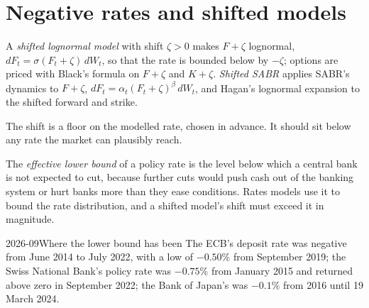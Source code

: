 \label{lst:rc:sabr-in-rates-and-the-volatility-cube:hagan}

\section{Negative rates and shifted models}

\begin{definition}\label{def:rc:sabr-in-rates-and-the-volatility-cube:shifted}
A \emph{shifted lognormal model} with shift
$\zeta>0$ makes $F+\zeta$ lognormal, $dF_t=\sigma(F_t+\zeta)\,dW_t$, so that the
rate is bounded below by $-\zeta$; options are priced with Black's formula on
$F+\zeta$ and $K+\zeta$. \emph{Shifted SABR} applies SABR's
dynamics to $F+\zeta$, $dF_t=\alpha_t(F_t+\zeta)^\beta\,dW_t$, and Hagan's lognormal
expansion to the shifted forward and strike.
\end{definition}

The shift is a floor on the modelled rate, chosen in advance. It should sit
below any rate the market can plausibly reach.

\begin{definition}\label{def:rc:sabr-in-rates-and-the-volatility-cube:elb}
The \emph{effective lower bound} of a policy rate is
the level below which a central bank is not expected to cut, because further
cuts would push cash out of the banking system or hurt banks more than they
ease conditions. Rates models use it to bound the rate distribution, and a
shifted model's shift must exceed it in magnitude.
\end{definition}

\begin{dated}{2026-09}{Where the lower bound has been}\label{dat:rc:sabr-in-rates-and-the-volatility-cube:elb}
The ECB's deposit rate was negative from June 2014 to July 2022, with a low of
$-0.50\%$ from September 2019; the Swiss National Bank's policy rate was
$-0.75\%$ from January 2015 and returned above zero in September 2022; the Bank
of Japan's was $-0.1\%$ from 2016 until 19 March 2024.
\end{dated}

